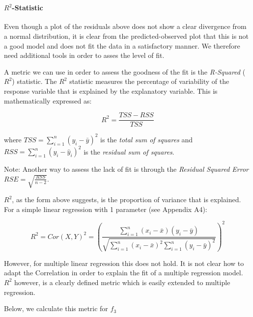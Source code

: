 \documentclass[11pt]{article}
\begin{document}
    \begin{center}
    \end{center}
    { \hspace*{\fill} \\}
    
    \hypertarget{r2-statistic}{%
\paragraph{\texorpdfstring{\(R^2\)-Statistic}{R\^{}2-Statistic}}\label{r2-statistic}}

Even though a plot of the residuals above does not show a clear
divergence from a normal distribution, it is clear from the
predicted-observed plot that this is not a good model and does not fit
the data in a satisfactory manner. We therefore need additional tools in
order to asses the level of fit.

A metric we can use in order to assess the goodness of the fit is the
\emph{R-Squared} (\(R^2\)) statistic. The \(R^2\) statistic measures the
percentage of variability of the response variable that is explained by
the explanatory variable. This is mathematically expressed as:

\[R^2 = \frac{TSS-RSS}{TSS}\]

where \(TSS = \sum_{i=1}^n(y_i - \bar{y})^2\) is the \emph{total sum of
squares} and \(RSS = \sum_{i=1}^n (y_i - \hat{y}_i)^2\) is the
\emph{residual sum of squares}.

Note: Another way to assess the lack of fit is through the
\emph{Residual Squared Error} \(RSE=\sqrt{ \frac{ RSS }{ n-2 } }\).

\(R^2\), as the form above suggests, is the proportion of variance that
is explained. For a simple linear regression with 1 parameter (see
Appendix A4):

\[R^2 = Cor(X,Y)^2 = \left( \frac{ \sum_{i=1}^n (x_i - \bar{x})(y_i - \bar{y}) }{ \sqrt{ \sum_{i=1}^n (x_i - \bar{x})^2 \sum_{i=1}^n (y_i - \bar{y})^2 } } \right) ^2\]

However, for multiple linear regression this does not hold. It is not
clear how to adapt the Correlation in order to explain the fit of a
multiple regression model. \(R^2\) however, is a clearly defined metric
which is easily extended to multiple regression.

Below, we calculate this metric for \(f_3\)
\end{document}
